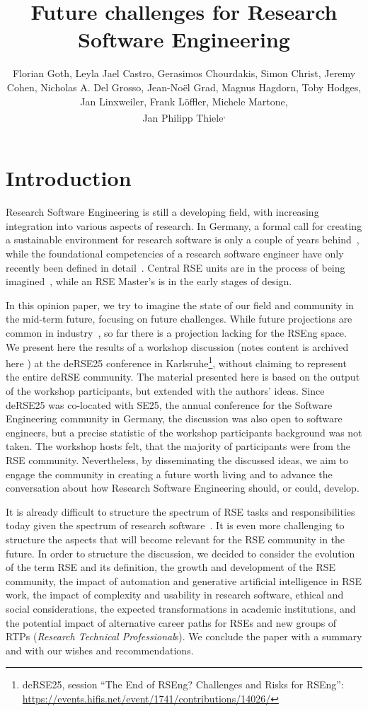 \documentclass{eceasst}
\title{Future challenges for Research Software Engineering} %
\author{
Florian Goth\authorRef{1},
Leyla Jael Castro\authorRef{2},
Gerasimos Chourdakis\authorRef{3},
Simon Christ\authorRef{4},
Jeremy Cohen\authorRef{5},
Nicholas A. Del Grosso\authorRef{6},
Jean-Noël Grad\authorRef{7},
Magnus Hagdorn\authorRef{8},
Toby Hodges\authorRef{9},
Jan Linxweiler\authorRef{10},
Frank Löffler\authorRef{11},
Michele Martone\authorRef{12},\\
Jan Philipp Thiele\authorRef{10}\textsuperscript{,}\authorRef{13}
} %
\institute{%
\autlabel{1} Institut für theoretische Physik 1, University of Würzburg, 97074, Würzburg, Germany\\
\autlabel{2} ZB MED Information Centre for Life Sciences, Cologne, Germany\\
\autlabel{3} Institute for Parallel and Distributed Systems, University of Stuttgart, Stuttgart, Germany\\
\autlabel{4} Leibniz University Hannover, Department of Cell Biology and Biophysics, Computational Biology, Germany\\
\autlabel{5} Imperial College London, London, UK\\
\autlabel{6} Institute for Experimental Epileptology and Cognition Research, Uniklinikum Bonn, Germany\\
\autlabel{7} Institute for Computational Physics, University of Stuttgart, Germany\\
\autlabel{8} Geschäftsbereich IT, Charité Universitätsmedizin Berlin, Germany\\
\autlabel{9} The Carpentries, USA\\
\autlabel{10} Technische Universität Braunschweig, Germany\\
\autlabel{11} Michael Stifel Center Jena {\&} Friedrich Schiller University Jena, Germany\\
\autlabel{12} orcid: 0000-0003-3239-8554 \orcidlink{0000-0003-3239-8554}\\
\autlabel{13} Weierstrass Institute, Berlin, Germany;
              Leibniz University Hannover, Institute of Applied Mathematics, Scientific Computing, Hannover, Germany\\
}
\begin{document}
\maketitle

\section{Introduction}

Research Software Engineering is still a developing field,
with increasing integration into various aspects of research.
In Germany, a formal call for creating a sustainable environment for research software
is only a couple of years behind~\cite{Anzt2021},
while the foundational competencies of a research software engineer have only recently been defined in detail~\cite{Goth2024}. Central RSE units are in the process of being imagined~\cite{Kempf2025-draft},
while an RSE Master's is in the early stages of design. 

In this opinion paper, we try to imagine the state of our field
and community in the mid-term future, focusing on future challenges.
While future projections are common in industry~\cite{Gartner2025},
so far there is a projection lacking for the RSEng space.
We present here the results of a workshop discussion (notes content is archived here \cite{goth2025_WSPad}) at the
deRSE25 conference in Karlsruhe\footnote{deRSE25, session ``The End of {RSEng}?
Challenges and Risks for {RSEng}'': \url{https://events.hifis.net/event/1741/contributions/14026/}},
without claiming to represent the entire deRSE community.
The material presented here is based on the output of the workshop participants, but extended with the authors' ideas.
Since deRSE25 was co-located with SE25, the annual conference for the Software Engineering community in Germany, the discussion was also open to software engineers,
but a precise statistic of the workshop participants background was not taken.
The workshop hosts felt, that the majority of participants were from the RSE community.
Nevertheless, by disseminating the discussed ideas,
we aim to engage the community in creating a future worth living
and to advance the conversation about how Research Software Engineering should, or could, develop.

It is already difficult to structure the spectrum of RSE tasks and responsibilities
today given the spectrum of research software~\cite{Hasselbring2024}.
It is even more challenging to structure the aspects that will become relevant for the RSE community in the future.
In order to structure the discussion, we decided to consider
the evolution of the term RSE and its definition,
the growth and development of the RSE community,
the impact of automation and generative artificial intelligence in RSE work,
the impact of complexity and usability in research software,
ethical and social considerations,
the expected transformations in academic institutions,
and the potential impact of alternative career paths for RSEs
and new groups of RTPs (\emph{Research Technical Professional}s).
We conclude the paper with a summary and with our wishes and recommendations.
\end{document}
